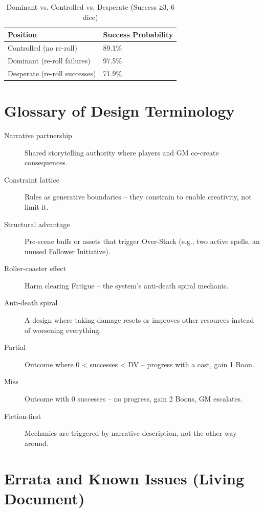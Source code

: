 \documentclass[11pt]{article}
\begin{document}
\begin{table}[h]
\centering
\caption{Dominant vs. Controlled vs. Desperate (Success ≥3, 6 dice)}
\begin{tabular}{ll}
\toprule
\textbf{Position} & \textbf{Success Probability} \\
\midrule
Controlled (no re-roll) & 89.1\% \\
Dominant (re-roll failures) & 97.5\% \\
Desperate (re-roll successes) & 71.9\% \\
\bottomrule
\end{tabular}
\end{table}

\section{Glossary of Design Terminology}
\label{sec:glossary}

\begin{description}
    \item[Narrative partnership] Shared storytelling authority where players and GM co-create consequences.
    \item[Constraint lattice] Rules as generative boundaries – they constrain to enable creativity, not limit it.
    \item[Structural advantage] Pre‑scene buffs or assets that trigger Over‑Stack (e.g., two active spells, an unused Follower Initiative).
    \item[Roller‑coaster effect] Harm clearing Fatigue – the system's anti‑death spiral mechanic.
    \item[Anti‑death spiral] A design where taking damage resets or improves other resources instead of worsening everything.
    \item[Partial] Outcome where 0 < successes < DV – progress with a cost, gain 1 Boon.
    \item[Miss] Outcome with 0 successes – no progress, gain 2 Boons, GM escalates.
    \item[Fiction‑first] Mechanics are triggered by narrative description, not the other way around.
\end{description}

\section{Errata and Known Issues (Living Document)}
\label{sec:errata}
\end{document}
